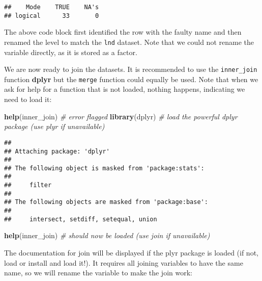 \documentclass[]{article}
\newenvironment{Shaded}{}{}
\newcommand{\KeywordTok}[1]{\textcolor[rgb]{0.00,0.44,0.13}{\textbf{{#1}}}}
\newcommand{\DataTypeTok}[1]{\textcolor[rgb]{0.56,0.13,0.00}{{#1}}}
\newcommand{\StringTok}[1]{\textcolor[rgb]{0.25,0.44,0.63}{{#1}}}
\newcommand{\CommentTok}[1]{\textcolor[rgb]{0.38,0.63,0.69}{\textit{{#1}}}}
\newcommand{\NormalTok}[1]{{#1}}
\begin{document}
\begin{verbatim}
##    Mode    TRUE    NA's 
## logical      33       0
\end{verbatim}

The above code block first identified the row with the faulty name and
then renamed the level to match the \texttt{lnd} dataset. Note that we
could not rename the variable directly, as it is stored as a factor.

We are now ready to join the datasets. It is recommended to use the
\texttt{inner\_join} function \textbf{dplyr} but the \texttt{merge}
function could equally be used. Note that when we ask for help for a
function that is not loaded, nothing happens, indicating we need to load
it:

\begin{Shaded}
\begin{Highlighting}[]
\KeywordTok{help}\NormalTok{(inner_join) }\CommentTok{# error flagged}
\KeywordTok{library}\NormalTok{(dplyr) }\CommentTok{# load the powerful dplyr package (use plyr if unavailable)}
\end{Highlighting}
\end{Shaded}

\begin{verbatim}
## 
## Attaching package: 'dplyr'
## 
## The following object is masked from 'package:stats':
## 
##     filter
## 
## The following objects are masked from 'package:base':
## 
##     intersect, setdiff, setequal, union
\end{verbatim}

\begin{Shaded}
\begin{Highlighting}[]
\KeywordTok{help}\NormalTok{(inner_join) }\CommentTok{# should now be loaded (use join if unavailable)}
\end{Highlighting}
\end{Shaded}

The documentation for join will be displayed if the plyr package is
loaded (if not, load or install and load it!). It requires all joining
variables to have the same name, so we will rename the variable to make
the join work:

\begin{Shaded}
\end{Shaded}
\end{document}

